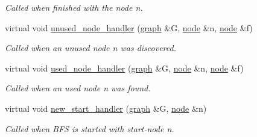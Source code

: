 \begin{DoxyCompactItemize}
\begin{DoxyCompactList}\small\item\em Called when finished with the node {\itshape n}. \end{DoxyCompactList}\item 
virtual void \mbox{\hyperlink{classbfs_a0e45c8fe90e54bffe18b308868ccc111}{unused\+\_\+node\+\_\+handler}} (\mbox{\hyperlink{classgraph}{graph}} \&G, \mbox{\hyperlink{classnode}{node}} \&n, \mbox{\hyperlink{classnode}{node}} \&f)
\begin{DoxyCompactList}\small\item\em Called when an unused node {\itshape n} was discovered. \end{DoxyCompactList}\item 
virtual void \mbox{\hyperlink{classbfs_ad2cbb1e9c36f561da0c91fd142296f2a}{used\+\_\+node\+\_\+handler}} (\mbox{\hyperlink{classgraph}{graph}} \&G, \mbox{\hyperlink{classnode}{node}} \&n, \mbox{\hyperlink{classnode}{node}} \&f)
\begin{DoxyCompactList}\small\item\em Called when an used node {\itshape n} was found. \end{DoxyCompactList}\item 
virtual void \mbox{\hyperlink{classbfs_a4f33f10121240390a5a50b5efc16c1f5}{new\+\_\+start\+\_\+handler}} (\mbox{\hyperlink{classgraph}{graph}} \&G, \mbox{\hyperlink{classnode}{node}} \&n)
\begin{DoxyCompactList}\small\item\em Called when B\+FS is started with start-\/node {\itshape n}. \end{DoxyCompactList}\end{DoxyCompactItemize}
